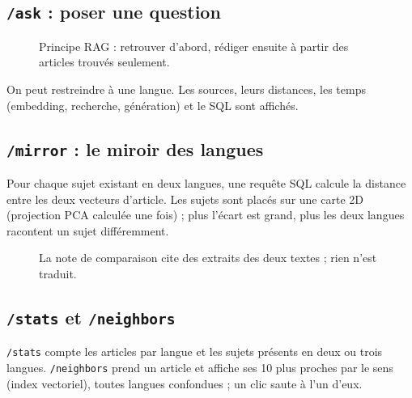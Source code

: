 \documentclass[11pt,a4paper]{article}
\begin{document}
\subsection{\texttt{/ask} : poser une question}
\begin{figure}[H]\centering
{}
\caption{Principe RAG : retrouver d'abord, rédiger ensuite à partir des articles trouvés seulement.}
\end{figure}
On peut restreindre à une langue. Les sources, leurs distances, les temps (embedding, recherche, génération) et le SQL sont affichés.

\subsection{\texttt{/mirror} : le miroir des langues}
Pour chaque sujet existant en deux langues, une requête SQL calcule la distance entre les deux vecteurs d'article. Les sujets sont placés sur une carte 2D (projection PCA calculée une fois) ; plus l'écart est grand, plus les deux langues racontent un sujet différemment.

\begin{figure}[H]\centering
{}
\caption{La note de comparaison cite des extraits des deux textes ; rien n'est traduit.}
\end{figure}

\subsection{\texttt{/stats} et \texttt{/neighbors}}
\texttt{/stats} compte les articles par langue et les sujets présents en deux ou trois langues. \texttt{/neighbors} prend un article et affiche ses 10 plus proches par le sens (index vectoriel), toutes langues confondues ; un clic saute à l'un d'eux.
\end{document}
